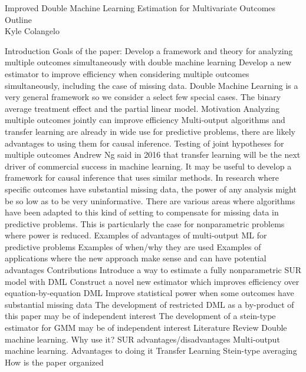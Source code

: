 \documentclass[12pt]{article}
\begin{document}
	\begin{center}
		Improved Double Machine Learning Estimation for Multivariate Outcomes \\
		Outline\\
		Kyle Colangelo
	\end{center}
\begin{outline}[enumerate]
	\1 Introduction
		\2 Goals of the paper:
			\3 Develop a framework and theory for analyzing multiple outcomes simultaneously with double machine learning
			\3 Develop a new estimator to improve efficiency when considering multiple outcomes simultaneously, including the case of missing data.
			\3 Double Machine Learning is a very general framework so we consider a select few special cases. The binary average treatment effect and the partial linear model.		
		\2 Motivation
			\3 Analyzing multiple outcomes jointly can improve efficiency
			\3 Multi-output algorithms and transfer learning are already in wide use for predictive problems, there are likely advantages to using them for causal inference.
			\3 Testing of joint hypotheses for multiple outcomes
			\3 Andrew Ng said in 2016 that transfer learning will be the next driver of commercial success in machine learning. It may be useful to develop a framework for causal inference that uses similar methods. 
			\3 In research where specific outcomes have substantial missing data, the power of any analysis might be so low as to be very uninformative. There are various areas where algorithms have been adapted to this kind of setting to compensate for missing data in predictive problems. This is particularly the case for nonparametric problems where power is reduced.
		\2 Examples of advantages of multi-output ML for predictive problems
			\3 Examples of when/why they are used
		\2 Examples of applications where the new approach make sense and can have potential advantages
		\2 Contributions
			\3 Introduce a way to estimate a fully nonparametric SUR model with DML
			\3 Construct a novel new estimator which improves efficiency over equation-by-equation DML
			\3 Improve statistical power when some outcomes have substantial missing data
			\3 The development of restricted DML as a by-product of this paper may be of independent interest
			\3 The development of a stein-type estimator for GMM may be of independent interest
		\2 Literature Review
			\3 Double machine learning. Why use it?
			\3 SUR advantages/disadvantages
			\3 Multi-output machine learning. Advantages to doing it
			\3 Transfer Learning
			\3 Stein-type averaging
		\2 How is the paper organized

\end{outline}
\end{document}
